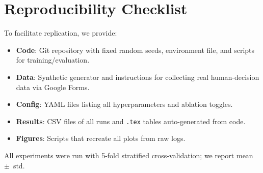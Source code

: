 \section{Reproducibility Checklist}
To facilitate replication, we provide:
\begin{itemize}
  \item \textbf{Code}: Git repository with fixed random seeds, environment file, and scripts for training/evaluation.
  \item \textbf{Data}: Synthetic generator and instructions for collecting real human-decision data via Google Forms.
  \item \textbf{Config}: YAML files listing all hyperparameters and ablation toggles.
  \item \textbf{Results}: CSV files of all runs and \texttt{.tex} tables auto-generated from code.
  \item \textbf{Figures}: Scripts that recreate all plots from raw logs.
\end{itemize}
All experiments were run with 5-fold stratified cross-validation; we report mean~$\pm$~std.